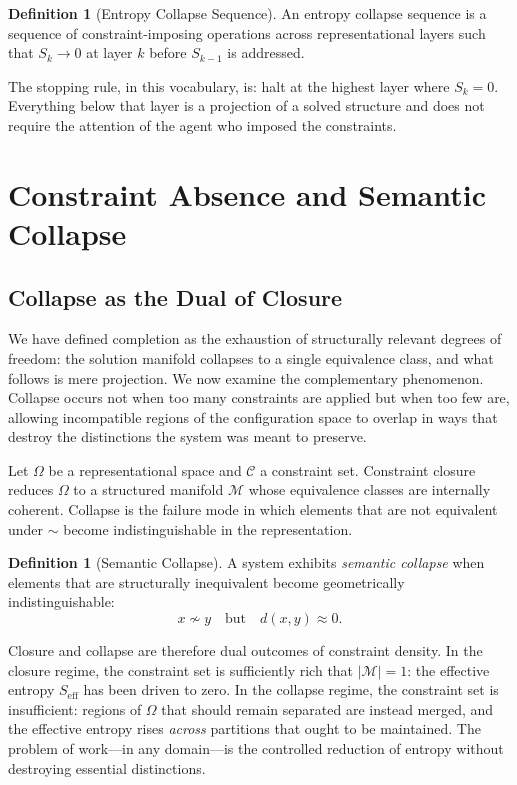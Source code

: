 \documentclass[11pt, twoside]{article}
\theoremstyle{plain}
\theoremstyle{definition}
\newtheorem{definition}[theorem]{Definition}
\theoremstyle{remark}
\newcommand{\Seff}{S_{\text{eff}}}
\begin{document}
\begin{definition}[Entropy Collapse Sequence]
An entropy collapse sequence is a sequence of constraint-imposing operations across representational layers such that $S_k \to 0$ at layer $k$ before $S_{k-1}$ is addressed.
\end{definition}

The stopping rule, in this vocabulary, is: halt at the highest layer where $S_k = 0$. Everything below that layer is a projection of a solved structure and does not require the attention of the agent who imposed the constraints.

\section{Constraint Absence and Semantic Collapse}
\label{sec:collapse}

\subsection{Collapse as the Dual of Closure}

We have defined completion as the exhaustion of structurally relevant degrees of freedom: the solution manifold collapses to a single equivalence class, and what follows is mere projection. We now examine the complementary phenomenon. Collapse occurs not when too many constraints are applied but when too few are, allowing incompatible regions of the configuration space to overlap in ways that destroy the distinctions the system was meant to preserve.

Let $\Omega$ be a representational space and $\mathcal{C}$ a constraint set. Constraint closure reduces $\Omega$ to a structured manifold $\mathcal{M}$ whose equivalence classes are internally coherent. Collapse is the failure mode in which elements that are not equivalent under $\sim$ become indistinguishable in the representation.

\begin{definition}[Semantic Collapse]
A system exhibits \emph{semantic collapse} when elements that are structurally inequivalent become geometrically indistinguishable:
\[
x \not\sim y \quad \text{but} \quad d(x,y) \approx 0.
\]
\end{definition}

Closure and collapse are therefore dual outcomes of constraint density. In the closure regime, the constraint set is sufficiently rich that $|\mathcal{M}| = 1$: the effective entropy $\Seff$ has been driven to zero. In the collapse regime, the constraint set is insufficient: regions of $\Omega$ that should remain separated are instead merged, and the effective entropy rises \emph{across} partitions that ought to be maintained. The problem of work---in any domain---is the controlled reduction of entropy without destroying essential distinctions.
\end{document}
